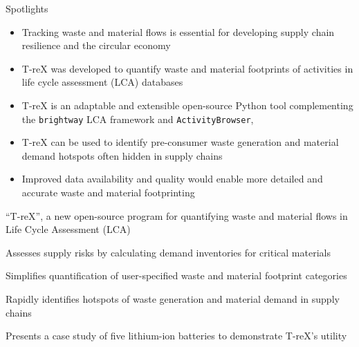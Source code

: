 \documentclass[review,3p,authoryear]{elsarticle}
\renewcommand{\texttt}[1]{{\ttfamily\small\nolinkurl{#1}}}
\begin{document}
\linenumbers{}


{\Large Spotlights}
\vspace{1em}
\begin{itemize}
    \item Tracking waste and material flows is essential for developing supply chain resilience and the circular economy
    \item T-reX was developed to quantify waste and material footprints of activities in life cycle assessment (LCA) databases
    \item T-reX is an adaptable and extensible open-source Python tool complementing the \texttt{brightway} LCA framework and \texttt{ActivityBrowser},
    \item T-reX can be used to identify pre-consumer waste generation and material demand hotspots often hidden in supply chains
    \item Improved data availability and quality would enable more detailed and accurate waste and material footprinting
\end{itemize}



\vspace{4em}

\begin{highlights}
    \item ``T-reX'', a new open-source program for quantifying waste and material flows in Life Cycle Assessment (LCA)
    \item Assesses supply risks by calculating demand inventories for critical materials
    \item Simplifies quantification of user-specified waste and material footprint categories
    \item Rapidly identifies hotspots of waste generation and material demand in supply chains
    \item Presents a case study of five lithium-ion batteries to demonstrate T-reX's utility
\end{highlights}
\end{document}
